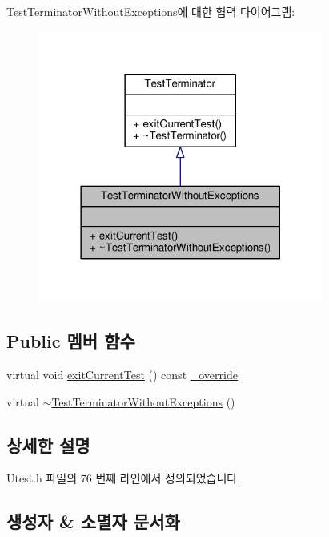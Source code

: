 Test\+Terminator\+Without\+Exceptions에 대한 협력 다이어그램\+:
\nopagebreak
\begin{figure}[H]
\begin{center}
\leavevmode
\includegraphics[width=266pt]{class_test_terminator_without_exceptions__coll__graph}
\end{center}
\end{figure}
\subsection*{Public 멤버 함수}
\begin{DoxyCompactItemize}
\item 
virtual void \hyperlink{class_test_terminator_without_exceptions_aea055d15b583b4c75114d737d94d2f53}{exit\+Current\+Test} () const \hyperlink{_cpp_u_test_config_8h_a049bea15dd750e15869863c94c1efc3b}{\+\_\+override}
\item 
virtual \hyperlink{class_test_terminator_without_exceptions_a6170f5d99ec2bc47d5dc77b0cc3d0aa7}{$\sim$\+Test\+Terminator\+Without\+Exceptions} ()
\end{DoxyCompactItemize}


\subsection{상세한 설명}


Utest.\+h 파일의 76 번째 라인에서 정의되었습니다.



\subsection{생성자 \& 소멸자 문서화}
